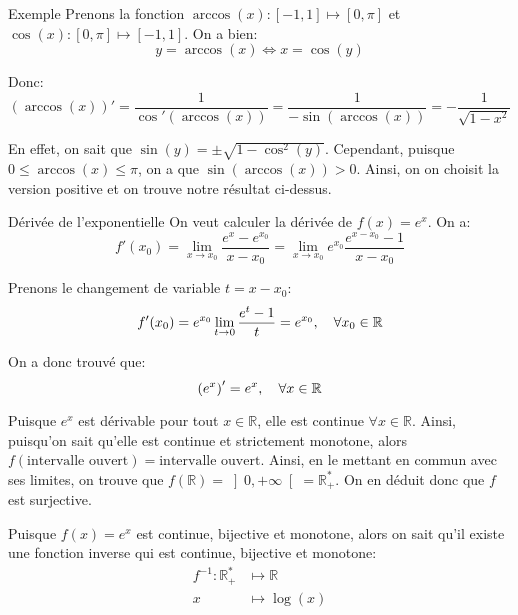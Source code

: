 \documentclass[a4paper]{article}
\begin{document}
\begin{parag}{Exemple}
    Prenons la fonction $\arccos\left(x\right) : \left[-1, 1\right] \mapsto \left[0, \pi\right]$ et $\cos\left(x\right) : \left[0, \pi\right] \mapsto \left[-1, 1\right]$. On a bien:
    \[y = \arccos\left(x\right) \iff x = \cos\left(y\right)\]

    Donc: 
    \[\left(\arccos\left(x\right)\right)' = \frac{1}{\cos'\left(\arccos\left(x\right)\right)} = \frac{1}{-\sin\left(\arccos\left(x\right)\right)} = - \frac{1}{\sqrt{1 - x^2}}\]

    En effet, on sait que $\sin\left(y\right) = \pm\sqrt{1 - \cos^2\left(y\right)}$. Cependant, puisque $0 \leq \arccos\left(x\right) \leq \pi$, on a que $\sin\left(\arccos\left(x\right)\right) > 0$. Ainsi, on on choisit la version positive et on trouve notre résultat ci-dessus.
\end{parag}


\begin{parag}{Dérivée de l'exponentielle}
    On veut calculer la dérivée de $f\left(x\right) = e^x$. On a: 
    \[f'\left(x_0\right) = \lim_{x \to x_0} \frac{e^x - e^{x_0}}{x - x_0} = \lim_{x \to x_0} e^{x_0} \frac{e^{x - x_0} - 1}{x - x_0}\]

    Prenons le changement de variable $t = x - x_0$: 
    \[f'\left(x_0\right) = e^{x_0}\lim_{t \to 0} \frac{e^t - 1}{t} = e^{x_0}, \mathspace \forall x_0 \in \mathbb{R}\]
    
    On a donc trouvé que: 
    \[\left(e^x\right)' = e^x, \mathspace \forall x \in \mathbb{R}\]
    
    Puisque $e^x$ est dérivable pour tout $x \in \mathbb{R}$, elle est continue $\forall x \in \mathbb{R}$. Ainsi, puisqu'on sait qu'elle est continue et strictement monotone, alors $f\left(\text{intervalle ouvert}\right) = \text{intervalle ouvert}$. Ainsi, en le mettant en commun avec ses limites, on trouve que $f\left(\mathbb{R}\right) = \left]0, +\infty\right[ = \mathbb{R}^*_+$. On en déduit donc que $f$ est surjective.

    Puisque $f\left(x\right) = e^x$ est continue, bijective et monotone, alors on sait qu'il existe une fonction inverse qui est continue, bijective et monotone:
    \[\begin{split}
        f^{-1}: \mathbb{R}^*_+ &\longmapsto \mathbb{R} \\
        x &\longmapsto \log\left(x\right)
    \end{split}\]
\end{parag}
\end{document}

